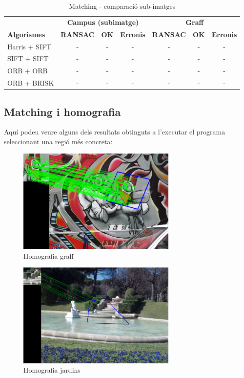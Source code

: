 		\begin{table}[H]
			\begin{center}
				\begin{tabular}{l | c c c | c c c}
					& \multicolumn{3}{c|}{\textbf{Campus (subimatge)}} & \multicolumn{3}{c}{\textbf{Graff}} \\
					\textbf{Algorismes} & \textbf{RANSAC} & \textbf{OK} & \textbf{Erronis} & \textbf{RANSAC} & \textbf{OK} & \textbf{Erronis} \\ \hline
					Harris + SIFT & - & - & - & - & - & - \\
					SIFT + SIFT & - & - & - & - & - & - \\
					ORB + ORB & - & - & - & - & - & - \\
					ORB + BRISK & - & - & - & - & - & - \\
				\end{tabular}
			\end{center}
			\caption{Matching - comparació sub-imatges}
		\end{table}
		\noindent

\newpage
	\subsection{Matching i homografia}
		Aquí podeu veure alguns dels resultats obtinguts a l'executar el programa seleccionant una regió més concreta:
		\begin{figure}[H]
			\centering
			\includegraphics[width=0.7\textwidth]{images/homography}
			\caption{Homografia graff}
		\end{figure}
		\begin{figure}[H]
			\centering
			\includegraphics[width=0.7\textwidth]{images/jardiSel}
			\caption{Homografia jardins}
		\end{figure}

